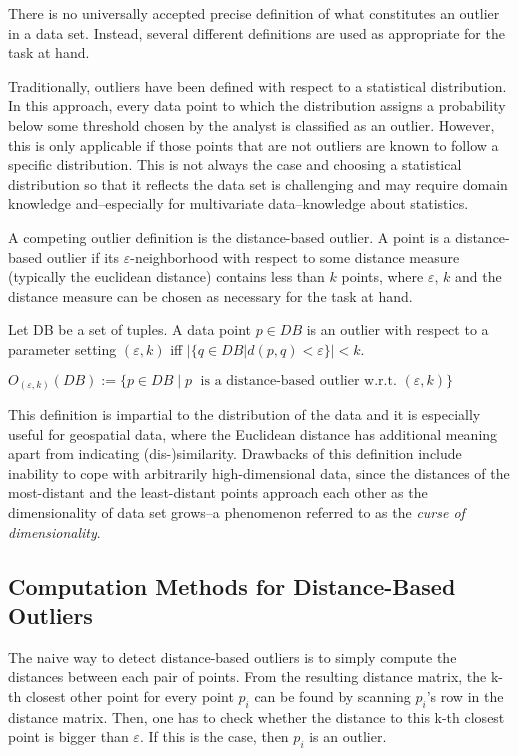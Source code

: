 \documentclass[runningheads]{llncs}
\begin{document}
There is no universally accepted precise definition of what constitutes an outlier in a data set\cite{kriegeldefinitions,outlier_definitions}. Instead, several different definitions are used as appropriate for the task at hand.

Traditionally, outliers have been defined with respect to a statistical distribution. In this approach, every data point to which the distribution assigns a probability below some threshold chosen by the analyst is classified as an outlier. However, this is only applicable if those points that are not outliers are known to follow a specific distribution. This is not always the case and choosing a statistical distribution so that it reflects the data set is challenging and may require domain knowledge and--especially for multivariate data--knowledge about statistics.

A competing outlier definition is the distance-based outlier. A point is a distance-based outlier if its $\varepsilon$-neighborhood with respect to some distance measure (typically the euclidean distance) contains less than $k$ points, where $\varepsilon$, $k$ and the distance measure can be chosen as necessary for the task at hand.

\begin{definition}
    Let DB be a set of tuples. A data point $p\in DB$ is an outlier with respect to a parameter setting $(\varepsilon,k)$ iff 
    $|\{q \in DB | d(p,q) < \varepsilon\}| < k$.

    $O_{(\varepsilon,k)}(DB) := \{p\in DB \;| \;p\;\text{ is a distance-based outlier w.r.t. }(\varepsilon,k) \}$
\end{definition}

This definition is impartial to the distribution of the data and it is especially useful for geospatial data, where the Euclidean distance has additional meaning apart from indicating (dis-)similarity. Drawbacks of this definition include inability to cope with arbitrarily high-dimensional data, since the distances of the most-distant and the least-distant points approach each other as the dimensionality of data set grows--a phenomenon referred to as the \emph{curse of dimensionality}\cite{curse_of_dimensionality}.
\subsection{Computation Methods for Distance-Based Outliers}

The naive way to detect distance-based outliers is to simply compute the distances between each pair of points. From the resulting distance matrix, the k-th closest other point for every point $p_i$ can be found by scanning $p_i$'s row in the distance matrix. Then, one has to check whether the distance to this k-th closest point is bigger than $\varepsilon$. If this is the case, then $p_i$ is an outlier.
\end{document}
